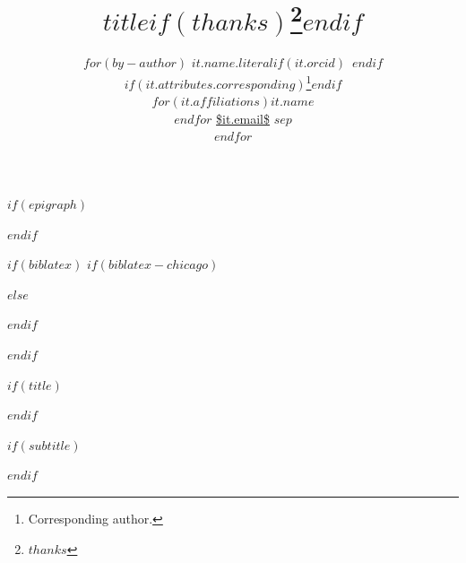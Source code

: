 $if(epigraph)$
\usepackage{epigraph}
\renewcommand{\epigraphsize}{\sffamily\footnotesize}
\setlength{\epigraphrule}{0em}
\setlength{\beforeepigraphskip}{-2em}
\setlength{\afterepigraphskip}{1em}
$endif$

$if(biblatex)$
$if(biblatex-chicago)$
\usepackage[$if(biblio-style)$$biblio-style$,$endif$$for(biblatexoptions)$$biblatexoptions$$sep$,$endfor$]{biblatex-chicago}
$else$
\usepackage[$if(biblio-style)$style=$biblio-style$,$endif$$for(biblatexoptions)$$biblatexoptions$$sep$,$endfor$]{biblatex}
$endif$
\setlength\bibitemsep{0pt}
\renewcommand*{\bibfont}{\footnotesize}
\setlength\bibhang{\parindent}

$endif$

\usepackage{orcidlink}

$if(title)$
\title{$title$$if(thanks)$\thanks{$thanks$}$endif$}
$endif$

$if(subtitle)$
\usepackage{etoolbox}
\makeatletter
\providecommand{\subtitle}[1]{\apptocmd{\@title}{\par {\vskip 0.25em \large #1 \par}}{}{}}
\makeatother
\subtitle{$subtitle$}
$endif$

\author{
$for(by-author)$
{\large $it.name.literal$$if(it.orcid)$~$endif$}%
$if(it.attributes.corresponding)$\thanks{Corresponding author.}$endif$ \\%
$for(it.affiliations)$$it.name$ \\$endfor$%
{\footnotesize \url{$it.email$}}%
$sep$\\[1.5em]%
$endfor$
}

\date{}
\usepackage{url}
